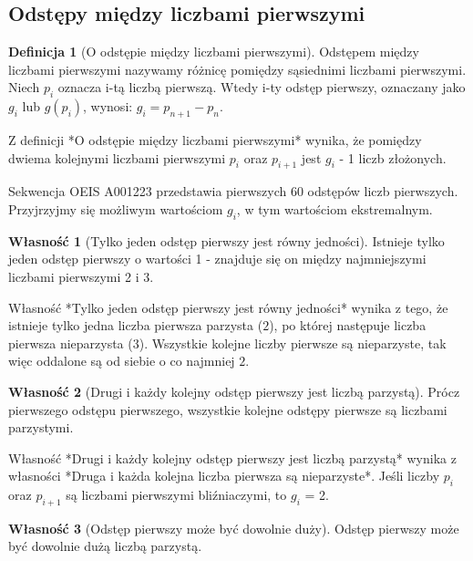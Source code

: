\documentclass[10pt,onecolumn]{article}
\theoremstyle{definition}
\newtheorem{definition}{Definicja}
\theoremstyle{hypothesis}
\theoremstyle{capability}
\newtheorem{capability}{Własność}
\begin{document}
\subsection{Odstępy między liczbami pierwszymi}

\begin{definition} [O odstępie między liczbami pierwszymi]
Odstępem między liczbami pierwszymi nazywamy różnicę pomiędzy sąsiednimi liczbami pierwszymi. Niech $p_i$ oznacza i-tą liczbą pierwszą. Wtedy i-ty odstęp pierwszy, oznaczany jako $g_i$ lub $g(p_i)$, wynosi: $g_i = p_{n+1} - p_n$.
\end{definition}

Z definicji *O odstępie między liczbami pierwszymi* wynika, że pomiędzy dwiema kolejnymi liczbami pierwszymi $p_i$ oraz $p_{i+1}$ jest $g_i$ - 1 liczb złożonych. \par

Sekwencja OEIS A001223 przedstawia pierwszych 60 odstępów liczb pierwszych. Przyjrzyjmy się możliwym wartościom $g_i$, w tym wartościom ekstremalnym.

\begin{capability}[Tylko jeden odstęp pierwszy jest równy jedności]
Istnieje tylko jeden odstęp pierwszy o wartości 1 - znajduje się on między najmniejszymi liczbami pierwszymi 2 i 3.
\end{capability}

Własność *Tylko jeden odstęp pierwszy jest równy jedności* wynika z tego, że istnieje tylko jedna liczba pierwsza parzysta ($2$), po której następuje liczba pierwsza nieparzysta ($3$). Wszystkie kolejne liczby pierwsze są nieparzyste, tak więc oddalone są od siebie o co najmniej $2$.

\begin{capability}[Drugi i każdy kolejny odstęp pierwszy jest liczbą parzystą]
Prócz pierwszego odstępu pierwszego, wszystkie kolejne odstępy pierwsze są liczbami parzystymi.
\end{capability}

Własność *Drugi i każdy kolejny odstęp pierwszy jest liczbą parzystą* wynika z własności *Druga i każda kolejna liczba pierwsza są nieparzyste*. Jeśli liczby $p_i$ oraz $p_{i+1}$ są liczbami pierwszymi bliźniaczymi, to $g_i$ = 2. 

\begin{capability}[Odstęp pierwszy może być dowolnie duży]
Odstęp pierwszy może być dowolnie dużą liczbą parzystą.
\end{capability}
\end{document}
